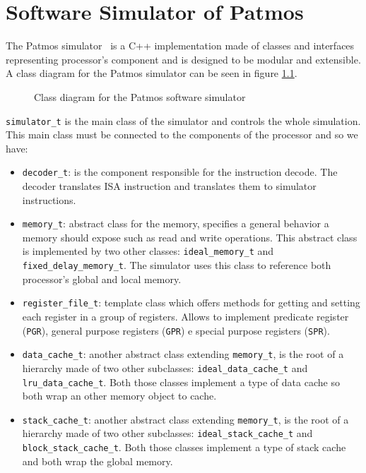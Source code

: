 \chapter{Software Simulator of Patmos}\label{Software simulator of Patmos}

The Patmos simulator~\cite{t-crest:d2.1} is a C++ implementation made of classes and interfaces representing processor's component and is designed to be modular and extensible. A class diagram for the Patmos simulator can be seen in figure \ref{fig:patmos_simulator}.

	\begin{figure}[!ht]
		\begin{center}
		\end{center}
		\caption{Class diagram for the Patmos software simulator}
		\label{fig:patmos_simulator}
	\end{figure}


\texttt{simulator\_t} is the main class of the simulator and controls the whole simulation. This main class must be connected to the components of the processor and so we have:

\begin{itemize}
	\item \texttt{decoder\_t}: is the component responsible for the instruction decode. The decoder translates ISA instruction and translates them to simulator instructions.
	\item \texttt{memory\_t}: abstract class for the memory, specifies a general behavior a memory should expose such as read and write operations. This abstract class is implemented by two other classes: \texttt{ideal\_memory\_t} and \texttt{fixed\_delay\_memory\_t}. The simulator uses this class to reference both processor's global and local memory.
	\item \texttt{register\_file\_t}: template class which offers methods for getting and setting each register in a group of registers. Allows to implement predicate register (\texttt{PGR}), general purpose registers (\texttt{GPR}) e special purpose registers (\texttt{SPR}).
	\item \texttt{data\_cache\_t}: another abstract class extending \texttt{memory\_t}, is the root of a hierarchy made of two other subclasses: \texttt{ideal\_data\_cache\_t} and \texttt{lru\_data\_cache\_t}. Both those classes implement a type of data cache so both wrap an other memory object to cache.
	\item \texttt{stack\_cache\_t}: another abstract class extending \texttt{memory\_t}, is the root of a hierarchy made of two other subclasses: \texttt{ideal\_stack\_cache\_t} and \texttt{block\_stack\_cache\_t}. Both those classes implement a type of stack cache and both wrap the global memory.
\end{itemize}


